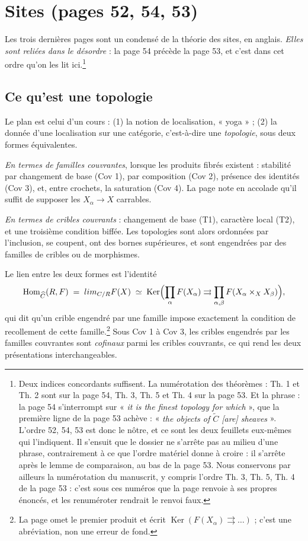 \documentclass[11pt,a4paper]{article}
\begin{document}
\section*{Sites (pages 52, 54, 53)}

Les trois dernières pages sont un condensé de la théorie des sites, en anglais.
\emph{Elles sont reliées dans le désordre} : la page 54 précède la page 53, et
c'est dans cet ordre qu'on les lit ici.\footnote{Deux indices concordants
suffisent. La numérotation des théorèmes : Th. 1 et Th. 2 sont sur la
page 54, Th. 3, Th. 5 et Th. 4 sur la page 53. Et la phrase : la page 54
s'interrompt sur « \emph{it is the finest topology for which} », que la
première ligne de la page 53 achève : « \emph{the objects of
$\widetilde{C}$ [are] sheaves} ». L'ordre 52, 54, 53 est donc le nôtre, et ce
sont les deux feuillets eux-mêmes qui l'indiquent.
Il s'ensuit que le dossier ne s'arrête pas au milieu d'une phrase, contrairement
à ce que l'ordre matériel donne à croire : il s'arrête après le lemme de
comparaison, au bas de la page 53. Nous conservons par ailleurs la numérotation
du manuscrit, y compris l'ordre Th. 3, Th. 5, Th. 4 de la page 53 : c'est sous
ces numéros que la page renvoie à ses propres énoncés, et les renuméroter
rendrait le renvoi faux.}

\subsection*{Ce qu'est une topologie}

Le plan est celui d'un cours : (1) la notion de localisation, « yoga » ; (2) la
donnée d'une localisation sur une catégorie, c'est-à-dire une
\emph{topologie}, sous deux formes équivalentes.

\emph{En termes de familles couvrantes}, lorsque les produits fibrés existent :
stabilité par changement de base (Cov 1), par composition (Cov 2), présence des
identités (Cov 3), et, entre crochets, la saturation (Cov 4). La page note en
accolade qu'il suffit de supposer les $X_{\alpha} \to X$ carrables.

\emph{En termes de cribles couvrants} : changement de base (T1), caractère
local (T2), et une troisième condition biffée. Les topologies sont alors
ordonnées par l'inclusion, se coupent, ont des bornes supérieures, et sont
engendrées par des familles de cribles ou de morphismes.

Le lien entre les deux formes est l'identité
\[
\operatorname{Hom}_{\widehat{C}}(R, F) \;=\; \varprojlim_{C/R} F(X)
\;\simeq\; \operatorname{Ker}\Bigl( \prod_{\alpha} F(X_{\alpha})
\rightrightarrows \prod_{\alpha,\beta} F(X_{\alpha} \times_{X} X_{\beta})
\Bigr),
\]
qui dit qu'un crible engendré par une famille impose exactement la condition de
recollement de cette famille.\footnote{La page omet le premier produit et écrit
$\operatorname{Ker}(F(X_{\alpha}) \rightrightarrows \ldots)$ ; c'est une
abréviation, non une erreur de fond.} Sous Cov 1 à Cov 3, les cribles engendrés
par les familles couvrantes sont \emph{cofinaux} parmi les cribles couvrants,
ce qui rend les deux présentations interchangeables.
\end{document}
